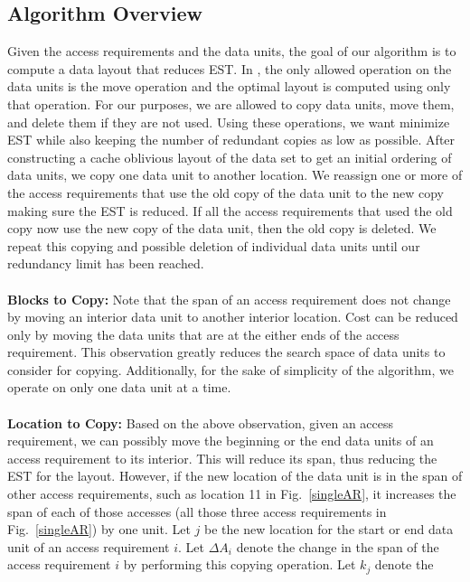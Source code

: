 \subsection{Algorithm Overview}

Given the access requirements and the data units, the goal of our algorithm is to compute a data layout that reduces EST. In \cite{cacheobliviouslayout}, the only allowed operation on the data units is
the move operation and the optimal layout is computed using only that
operation. For our purposes, we are allowed to copy data units, move them, and
delete them if they are not used. Using these operations, we want minimize EST
while also keeping the number of redundant copies as low as possible. After constructing a cache oblivious layout 
of the data set to get an initial ordering of data units, we copy one data unit
to another location. We reassign one or more of the access requirements that
use the old copy of the data unit to the new copy making sure the EST is
reduced.  If all the access requirements that used the old copy now use the
new copy of the data unit, then the old copy is deleted.  We repeat this
copying and possible deletion of individual data units until our redundancy
limit has been reached. \\
\\
{\bf Blocks to Copy:} Note that the span of an access requirement does not
change by moving an interior data unit to another interior location. Cost can
be reduced only by moving the data units that are at the either ends of the access
requirement. This observation greatly reduces the search space of data units to
consider for copying. Additionally, for the sake of simplicity of the algorithm, we operate
on only one data unit at a time. \\
\\
{\bf Location to Copy:} Based on the above observation, given an access
requirement, we can possibly move the beginning or the end data units of an
access requirement to its interior. This will reduce its span, thus reducing
the EST for the layout. However, if the new location of the data unit is in the
span of other access requirements, such as location 11 in Fig.~\ref{singleAR},
it increases the span of each of those accesses (all those three access
requirements in Fig.~\ref{singleAR}) by one unit.
Let $j$ be the new location for the start or end data unit of an access
requirement $i$. Let $\Delta A_i$ denote the change in the span of the access
requirement $i$ by performing this copying operation. Let  $k_j$ denote the
